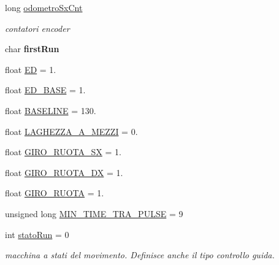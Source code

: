 \begin{DoxyCompactItemize}
long \mbox{\hyperlink{ari_pi__2_d_c__esp__08_8ino_ab4ce4d95d7983a12a924f49196f9b9a5}{odometro\+Sx\+Cnt}}
\begin{DoxyCompactList}\small\item\em contatori encoder \end{DoxyCompactList}\item 
\mbox{\label{ari_pi__2_d_c__esp__08_8ino_a7acc771f00b743e5b3e0d2512eb5329b}} 
char {\bfseries first\+Run}
\item 
float \mbox{\hyperlink{ari_pi__2_d_c__esp__08_8ino_a46145722dc21eed1a702b867ced59e49}{ED}} = 1.
\item 
float \mbox{\hyperlink{ari_pi__2_d_c__esp__08_8ino_aab9585a72373b934a8e78ac806c57f50}{E\+D\+\_\+\+B\+A\+SE}} = 1.
\item 
float \mbox{\hyperlink{ari_pi__2_d_c__esp__08_8ino_a9c5bc38bd76775bbcb1e430646060ca5}{B\+A\+S\+E\+L\+I\+NE}} = 130.
\item 
float \mbox{\hyperlink{ari_pi__2_d_c__esp__08_8ino_a023cb7e635b51ac94b3e22f2b6ac8f9c}{L\+A\+G\+H\+E\+Z\+Z\+A\+\_\+\+A\+\_\+\+M\+E\+Z\+ZI}} = 0.
\item 
float \mbox{\hyperlink{ari_pi__2_d_c__esp__08_8ino_aeee767366b9e5e9bb8022b27fcbb7e68}{G\+I\+R\+O\+\_\+\+R\+U\+O\+T\+A\+\_\+\+SX}} = 1.
\item 
float \mbox{\hyperlink{ari_pi__2_d_c__esp__08_8ino_a87caded4c49d6deea703487e7f11d9e3}{G\+I\+R\+O\+\_\+\+R\+U\+O\+T\+A\+\_\+\+DX}} = 1.
\item 
float \mbox{\hyperlink{ari_pi__2_d_c__esp__08_8ino_ac57aebfcef0c4d31360b170366395c4a}{G\+I\+R\+O\+\_\+\+R\+U\+O\+TA}} = 1.
\item 
unsigned long \mbox{\hyperlink{ari_pi__2_d_c__esp__08_8ino_a6a8d27409d947dce17cce28a56701a5c}{M\+I\+N\+\_\+\+T\+I\+M\+E\+\_\+\+T\+R\+A\+\_\+\+P\+U\+L\+SE}} = 9
\item 
\mbox{\label{ari_pi__2_d_c__esp__08_8ino_a5339db6126d080787f8511e2aae71e34}} 
int \mbox{\hyperlink{ari_pi__2_d_c__esp__08_8ino_a5339db6126d080787f8511e2aae71e34}{stato\+Run}} = 0
\begin{DoxyCompactList}\small\item\em macchina a stati del movimento. Definisce anche il tipo controllo guida. \end{DoxyCompactList}\item 
\mbox{\label{ari_pi__2_d_c__esp__08_8ino_ac36ade784c05554d24241a2fa860bbaa}} 

\end{DoxyCompactItemize}
